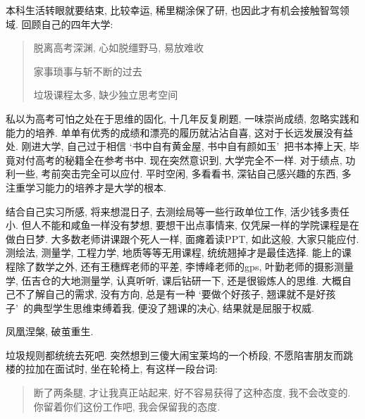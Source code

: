 \documentclass[a4paper, UTF8,  12pt]{article}
\begin{document}
本科生活转眼就要结束, 比较幸运, 稀里糊涂保了研, 也因此才有机会接触智驾领域. 回顾自己的四年大学: 
\begin{quotation}
	脱离高考深渊, 心如脱缰野马, 易放难收

	家事琐事与斩不断的过去

	垃圾课程太多, 缺少独立思考空间

\end{quotation}

私以为高考可怕之处在于思维的固化, 十几年反复刷题, 一味崇尚成绩, 忽略实践和能力的培养. 单单有优秀的成绩和漂亮的履历就沾沾自喜, 这对于长远发展没有益处. 刚进大学, 自己过于相信 \lq 书中自有黄金屋, 书中自有颜如玉\rq\ 把书本捧上天, 毕竟对付高考的秘籍全在参考书中. 现在突然意识到, 大学完全不一样. 对于绩点, 功利一些, 考前突击完全可以应付. 平时空闲, 多看看书, 深钻自己感兴趣的东西, 多注重学习能力的培养才是大学的根本.

结合自己实习所感, 将来想混日子, 去测绘局等一些行政单位工作, 活少钱多责任小. 但人不能和咸鱼一样没有梦想, 要想干出点事情来, 仅凭屎一样的学院课程是在做白日梦. 大多数老师讲课跟个死人一样, 面瘫着读PPT, 如此这般, 大家只能应付. 测绘法, 测量学, 工程力学, 地质等等无用课程, 统统翘掉才是最佳选择. 能上的课程除了数学之外, 还有王穗辉老师的平差, 李博峰老师的gps, 叶勤老师的摄影测量学, 伍吉仓的大地测量学, 认真听听, 课后钻研一下, 还是很锻炼人的思维. 大概自己不了解自己的需求, 没有方向, 总是有一种 \lq 要做个好孩子, 翘课就不是好孩子\rq\ 的典型学生思维束缚着我, 便没了翘课的决心, 结果就是屈服于权威. 

凤凰涅槃, 破茧重生.

垃圾规则都统统去死吧. 突然想到三傻大闹宝莱坞的一个桥段, 不愿陷害朋友而跳楼的拉加在面试时, 坐在轮椅上, 有这样一段台词:
\begin{quotation}
    断了两条腿, 才让我真正站起来, 好不容易获得了这种态度, 我不会改变的. 你留着你们这份工作吧, 我会保留我的态度.        
\end{quotation}
\end{document}
